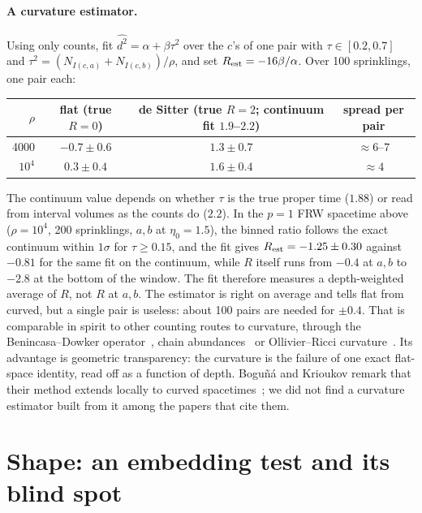 \documentclass[11pt,a4paper]{article}
\begin{document}
\paragraph{A curvature estimator.} Using only counts, fit $\widehat{d^2}=\alpha+\beta\tau^2$ over the $c$'s of one pair with $\tau\in[0.2,0.7]$ and $\tau^2=(N_{I(c,a)}+N_{I(c,b)})/\rho$, and set $R_{\rm est}=-16\beta/\alpha$. Over 100 sprinklings, one pair each:
\begin{center}\small
\begin{tabular}{@{}rccc@{}}
\toprule
$\rho$ & flat (true $R=0$) & de Sitter (true $R=2$; continuum fit $1.9$--$2.2$) & spread per pair\\
\midrule
4000 & $-0.7\pm0.6$ & $1.3\pm0.7$ & $\approx6$--$7$\\
$10^4$ & $0.3\pm0.4$ & $1.6\pm0.4$ & $\approx4$\\
\bottomrule
\end{tabular}
\end{center}
The continuum value depends on whether $\tau$ is the true proper time ($1.88$) or read from interval volumes as the counts do ($2.2$). In the $p=1$ FRW spacetime above ($\rho=10^4$, 200 sprinklings, $a,b$ at $\eta_0=1.5$), the binned ratio follows the exact continuum within $1\sigma$ for $\tau\ge0.15$, and the fit gives $R_{\rm est}=-1.25\pm0.30$ against $-0.81$ for the same fit on the continuum, while $R$ itself runs from $-0.4$ at $a,b$ to $-2.8$ at the bottom of the window. The fit therefore measures a depth-weighted average of $R$, not $R$ at $a,b$. The estimator is right on average and tells flat from curved, but a single pair is useless: about 100 pairs are needed for $\pm0.4$. That is comparable in spirit to other counting routes to curvature, through the Benincasa--Dowker operator~\cite{BD10}, chain abundances~\cite{RSS13} or Ollivier--Ricci curvature~\cite{BBR26}. Its advantage is geometric transparency: the curvature is the failure of one exact flat-space identity, read off as a function of depth. Bogu\~n\'a and Krioukov remark that their method extends locally to curved spacetimes~\cite{BK24}; we did not find a curvature estimator built from it among the papers that cite them.

\section{Shape: an embedding test and its blind spot}\label{sec:embed}
\end{document}
